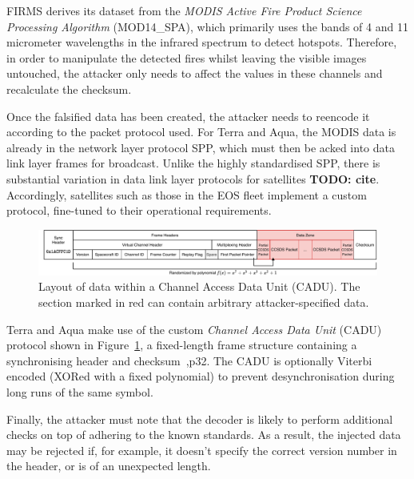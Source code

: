 FIRMS derives its dataset from the \textit{MODIS Active Fire Product Science Processing Algorithm} (MOD14\_SPA), which primarily uses the bands of 4 and 11 micrometer wavelengths in the infrared spectrum to detect hotspots.
Therefore, in order to manipulate the detected fires whilst leaving the visible images untouched, the attacker only needs to affect the values in these channels and recalculate the checksum.

Once the falsified data has been created, the attacker needs to reencode it according to the packet protocol used.
For Terra and Aqua, the MODIS data is already in the network layer protocol SPP, which must then be acked into data link layer frames for broadcast.
Unlike the highly standardised SPP, there is substantial variation in data link layer protocols for satellites \textbf{TODO: cite}.
Accordingly, satellites such as those in the EOS fleet implement a custom protocol, fine-tuned to their operational requirements.

\begin{figure}
    \centering
    \includegraphics[width=\textwidth]{diagrams/cadu_diagram.pdf}
    \caption{Layout of data within a Channel Access Data Unit (CADU). The section marked in red can contain arbitrary attacker-specified data.}
    \label{fig:cadu_diagram}
\end{figure}

Terra and Aqua make use of the custom \textit{Channel Access Data Unit} (CADU) protocol shown in Figure~\ref{fig:cadu_diagram}, a fixed-length frame structure containing a synchronising header and checksum~\cite{spaceGroundAqua},p32.
The CADU is optionally Viterbi encoded (XORed with a fixed polynomial) to prevent desynchronisation during long runs of the same symbol.

Finally, the attacker must note that the decoder is likely to perform additional checks on top of adhering to the known standards.
As a result, the injected data may be rejected if, for example, it doesn't specify the correct version number in the header, or is of an unexpected length.


